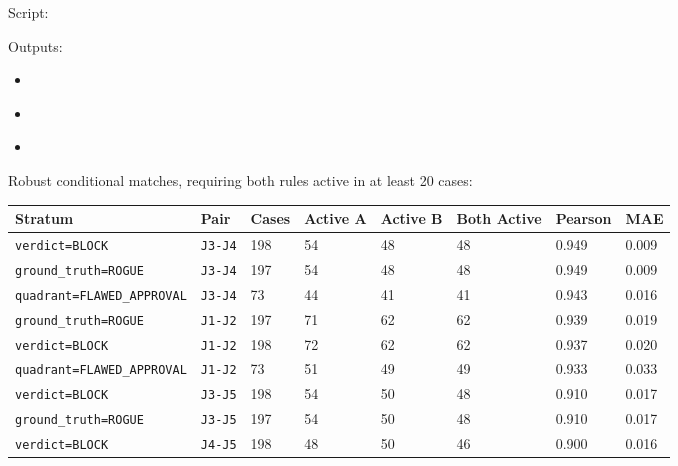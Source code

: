 \documentclass[11pt]{article}
\begin{document}
Script:

\href{../scripts/analyze_conditional_rule_redundancy.py}{}

Outputs:

\begin{itemize}[leftmargin=1.5em]
  \item \href{../results/conditional/conditional_redundancy_summary_reruns.csv}{}
  \item \href{../results/conditional/conditional_stability_profile_pairs_reruns.csv}{}
  \item \href{../results/conditional/conditional_stability_profile_implications_reruns.csv}{}
\end{itemize}

Robust conditional matches, requiring both rules active in at least 20 cases:

\begingroup
\small
\begin{longtable}{L{0.24\textwidth} L{0.12\textwidth} R{0.07\textwidth} R{0.08\textwidth} R{0.08\textwidth} R{0.09\textwidth} R{0.08\textwidth} R{0.07\textwidth}}
\toprule
Stratum & Pair & Cases & Active A & Active B & Both Active & Pearson & MAE \\
\midrule
\endhead
\texttt{verdict=BLOCK} & \texttt{J3-J4} & 198 & 54 & 48 & 48 & 0.949 & 0.009 \\
\texttt{ground\_truth=ROGUE} & \texttt{J3-J4} & 197 & 54 & 48 & 48 & 0.949 & 0.009 \\
\texttt{quadrant=FLAWED\_APPROVAL} & \texttt{J3-J4} & 73 & 44 & 41 & 41 & 0.943 & 0.016 \\
\texttt{ground\_truth=ROGUE} & \texttt{J1-J2} & 197 & 71 & 62 & 62 & 0.939 & 0.019 \\
\texttt{verdict=BLOCK} & \texttt{J1-J2} & 198 & 72 & 62 & 62 & 0.937 & 0.020 \\
\texttt{quadrant=FLAWED\_APPROVAL} & \texttt{J1-J2} & 73 & 51 & 49 & 49 & 0.933 & 0.033 \\
\texttt{verdict=BLOCK} & \texttt{J3-J5} & 198 & 54 & 50 & 48 & 0.910 & 0.017 \\
\texttt{ground\_truth=ROGUE} & \texttt{J3-J5} & 197 & 54 & 50 & 48 & 0.910 & 0.017 \\
\texttt{verdict=BLOCK} & \texttt{J4-J5} & 198 & 48 & 50 & 46 & 0.900 & 0.016 \\
\bottomrule
\end{longtable}
\endgroup
\end{document}
